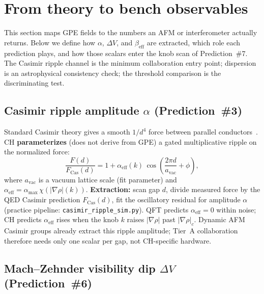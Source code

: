 \documentclass[11pt,a4paper]{article}
\begin{document}
\section{From theory to bench observables}
\label{sec:observables}

This section maps GPE fields to the numbers an AFM or interferometer actually returns.
Below we define how $\alpha$, $\Delta V$, and $\beta_{\mathrm{eff}}$ are extracted, which role each prediction plays, and how those scalars enter the knob scan of Prediction~\#7.
The Casimir ripple channel is the minimum collaboration entry point; dispersion is an astrophysical consistency check; the threshold comparison is the discriminating test.

\subsection{Casimir ripple amplitude $\alpha$ (Prediction~\#3)}

Standard Casimir theory gives a smooth $1/d^4$ force between parallel conductors~\cite{Casimir1948}.
CH \textbf{parameterizes} (does not derive from GPE) a gated multiplicative ripple on the normalized force:
\begin{equation}
  \frac{F(d)}{F_{\mathrm{Cas}}(d)} = 1 + \alpha_{\mathrm{eff}}(k)\,
  \cos\!\left(\frac{2\pi d}{a_{\mathrm{vac}}} + \phi\right),
  \label{eq:casimir-ripple}
\end{equation}
where $a_{\mathrm{vac}}$ is a vacuum lattice scale (fit parameter) and $\alpha_{\mathrm{eff}} = \alpha_{\max}\,\chi(|\nabla\rho|(k))$.
\textbf{Extraction:} scan gap $d$, divide measured force by the QED Casimir prediction $F_{\mathrm{Cas}}(d)$, fit the oscillatory residual for amplitude $\alpha$ (practice pipeline: \texttt{casimir\_ripple\_sim.py}).
QFT predicts $\alpha_{\mathrm{eff}} = 0$ within noise; CH predicts $\alpha_{\mathrm{eff}}$ rises when the knob $k$ raises $|\nabla\rho|$ past $|\nabla\rho|_c$.
Dynamic AFM Casimir groups already extract this ripple amplitude; Tier~A collaboration therefore needs only one scalar per gap, not CH-specific hardware.

\subsection{Mach--Zehnder visibility dip $\Delta V$ (Prediction~\#6)}
\end{document}
